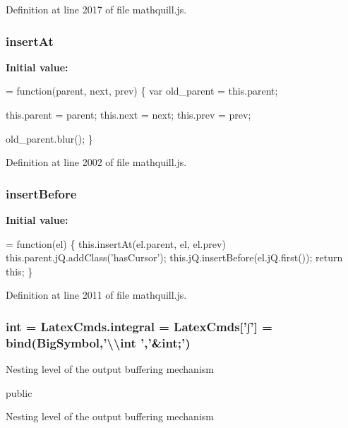 Definition at line 2017 of file mathquill.\-js.

\subsubsection[{insert\-At}]{\setlength{\rightskip}{0pt plus 5cm}{\bf \-\_\-} insert\-At}\label{mathquill_8js_a21d89a2c0e401501a7f7252912cd3af9}
{\bfseries Initial value\-:}
\begin{DoxyCode}
= \textcolor{keyword}{function}(parent, next, prev) \{
  var old\_parent = this.parent;

  this.parent = parent;
  this.next = next;
  this.prev = prev;

  old\_parent.blur(); 
\}
\end{DoxyCode}


Definition at line 2002 of file mathquill.\-js.

\subsubsection[{insert\-Before}]{\setlength{\rightskip}{0pt plus 5cm}{\bf \-\_\-} insert\-Before}\label{mathquill_8js_a6beb871d9574a2e254f01727cbaec277}
{\bfseries Initial value\-:}
\begin{DoxyCode}
= \textcolor{keyword}{function}(el) \{
  this.insertAt(el.parent, el, el.prev)
  this.parent.jQ.addClass('hasCursor');
  this.jQ.insertBefore(el.jQ.first());
  return this;
\}
\end{DoxyCode}


Definition at line 2011 of file mathquill.\-js.

\subsubsection[{int}]{\setlength{\rightskip}{0pt plus 5cm}int = Latex\-Cmds.\-integral = {\bf Latex\-Cmds}['∫'] = {\bf bind}({\bf Big\-Symbol},'\textbackslash{}\textbackslash{}int ','\&int;')}\label{mathquill_8js_a61569f2965b7a369eb10b6d75d410d11}
Nesting level of the output buffering mechanism

public

Nesting level of the output buffering mechanism

